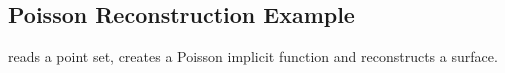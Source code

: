 \subsection{Poisson Reconstruction Example}

 reads a point set, creates a Poisson implicit function
and reconstructs a surface.



